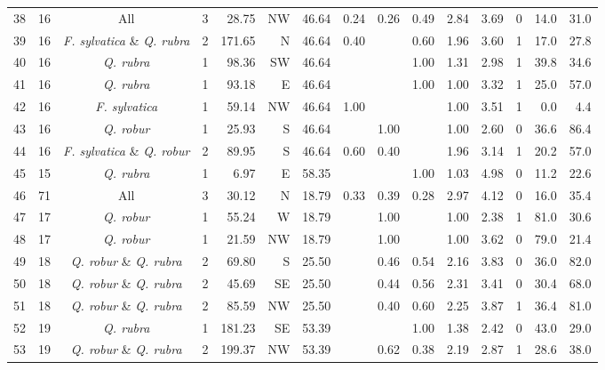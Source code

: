 \documentclass[b5paper,10pt]{book} %
\begin{document}
\begin{sidewaystable}
\begin{center}
\begin{footnotesize}
\begin{tabular}{l l c r r r r r r r r r r r r}
38 & 16 & All & 3 & 28.75 & NW & 46.64 & 0.24 & 0.26 & 0.49 & 2.84 & 3.69 & 0 & 14.0 & 31.0 \\
39 & 16 & \textit{F. sylvatica} \& \textit{Q. rubra} & 2 & 171.65 & N & 46.64 & 0.40 &  & 0.60 & 1.96 & 3.60 & 1 & 17.0 & 27.8 \\
40 & 16 & \textit{Q. rubra} & 1 & 98.36 & SW & 46.64 &  &  & 1.00 & 1.31 & 2.98 & 1 & 39.8 & 34.6 \\
41 & 16 & \textit{Q. rubra} & 1 & 93.18 & E & 46.64 &  &  & 1.00 & 1.00 & 3.32 & 1 & 25.0 & 57.0 \\
42 & 16 & \textit{F. sylvatica} & 1 & 59.14 & NW & 46.64 & 1.00 &  &  & 1.00 & 3.51 & 1 & 0.0 & 4.4 \\
43 & 16 & \textit{Q. robur} & 1 & 25.93 & S & 46.64 &  & 1.00 &  & 1.00 & 2.60 & 0 & 36.6 & 86.4 \\
44 & 16 & \textit{F. sylvatica} \& \textit{Q. robur} & 2 & 89.95 & S & 46.64 & 0.60 & 0.40 &  & 1.96 & 3.14 & 1 & 20.2 & 57.0 \\
45 & 15 & \textit{Q. rubra} & 1 & 6.97 & E & 58.35 &  &  & 1.00 & 1.03 & 4.98 & 0 & 11.2 & 22.6 \\
46 & 71 & All & 3 & 30.12 & N & 18.79 & 0.33 & 0.39 & 0.28 & 2.97 & 4.12 & 0 & 16.0 & 35.4 \\
47 & 17 & \textit{Q. robur} & 1 & 55.24 & W & 18.79 &  & 1.00 &  & 1.00 & 2.38 & 1 & 81.0 & 30.6 \\
48 & 17 & \textit{Q. robur} & 1 & 21.59 & NW & 18.79 &  & 1.00 &  & 1.00 & 3.62 & 0 & 79.0 & 21.4 \\
49 & 18 & \textit{Q. robur} \& \textit{Q. rubra} & 2 & 69.80 & S & 25.50 &  & 0.46 & 0.54 & 2.16 & 3.83 & 0 & 36.0 & 82.0 \\
50 & 18 & \textit{Q. robur} \& \textit{Q. rubra} & 2 & 45.69 & SE & 25.50 &  & 0.44 & 0.56 & 2.31 & 3.41 & 0 & 30.4 & 68.0 \\
51 & 18 & \textit{Q. robur} \& \textit{Q. rubra} & 2 & 85.59 & NW & 25.50 &  & 0.40 & 0.60 & 2.25 & 3.87 & 1 & 36.4 & 81.0 \\
52 & 19 & \textit{Q. rubra} & 1 & 181.23 & SE & 53.39 &  &  & 1.00 & 1.38 & 2.42 & 0 & 43.0 & 29.0 \\
53 & 19 & \textit{Q. robur} \& \textit{Q. rubra} & 2 & 199.37 & NW & 53.39 &  & 0.62 & 0.38 & 2.19 & 2.87 & 1 & 28.6 & 38.0 \\
\bottomrule
\end{tabular}
	\end{footnotesize}
	  \end{center}
	\end{sidewaystable}
\end{document}
